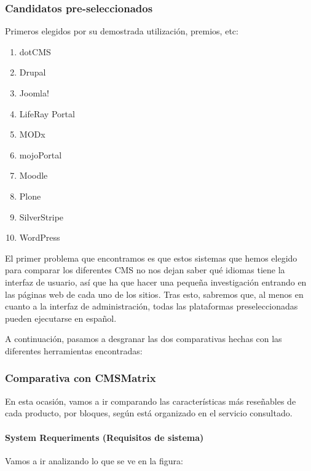 \subsubsection{Candidatos pre-seleccionados}
\par Primeros elegidos por su demostrada utilización, premios, etc:

\begin{enumerate}
\item dotCMS
\item Drupal
\item Joomla!
\item LifeRay Portal
\item MODx
\item mojoPortal
\item Moodle
\item Plone
\item SilverStripe
\item WordPress
\end{enumerate}

\par El primer problema que encontramos es que estos sistemas que hemos elegido para comparar los diferentes CMS no nos dejan saber qué idiomas tiene la interfaz de usuario, así que ha que hacer una pequeña investigación entrando en las páginas web de cada uno de los sitios. Tras esto, sabremos que, al menos en cuanto a la interfaz de administración, todas las plataformas preseleccionadas pueden ejecutarse en español.


\par A continuación, pasamos a desgranar las dos comparativas hechas con las diferentes herramientas encontradas:

\subsubsection{Comparativa con CMSMatrix}

\par En esta ocasión, vamos a ir comparando las características más reseñables de cada producto, por bloques, según está organizado en el servicio consultado.

\paragraph{System Requeriments (Requisitos de sistema)}

\par Vamos a ir analizando lo que se ve en la figura:

